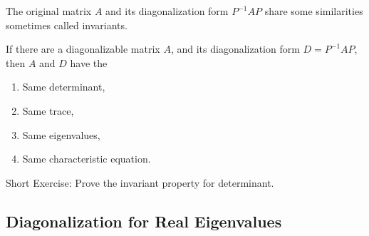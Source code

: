The original matrix $A$ and its diagonalization form $P^{-1}AP$ share some similarities sometimes called invariants. 
\begin{proper}
If there are a diagonalizable matrix $A$, and its diagonalization form $D = P^{-1}AP$, then $A$ and $D$ have the
\begin{enumerate}
\item Same determinant, 
\item Same trace, 
\item Same eigenvalues, 
\item Same characteristic equation.
\end{enumerate}
\end{proper}
Short Exercise: Prove the invariant property for determinant.

\subsection{Diagonalization for Real Eigenvalues}

